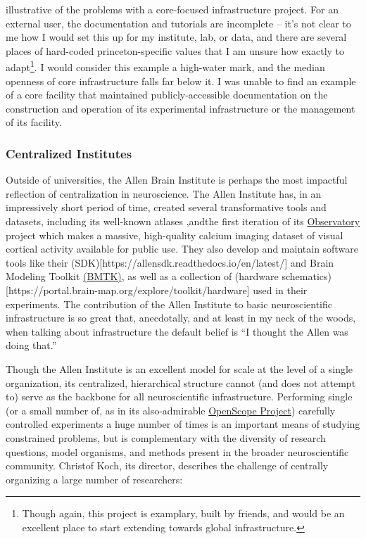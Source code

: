 \documentclass{article}
\begin{document}
illustrative of the problems with a core-focused infrastructure project.
For an external user, the documentation and tutorials are incomplete --
it's not clear to me how I would set this up for my institute, lab, or
data, and there are several places of hard-coded princeton-specific
values that I am unsure how exactly to adapt\footnote{Though again, this
  project is examplary, built by friends, and would be an excellent
  place to start extending towards global infrastructure.}. I would
consider this example a high-water mark, and the median openness of core
infrastructure falls far below it. I was unable to find an example of a
core facility that maintained publicly-accessible documentation on the
construction and operation of its experimental infrastructure or the
management of its facility.

\hypertarget{centralized-institutes}{%
\subsubsection{Centralized Institutes}\label{centralized-institutes}}

Outside of universities, the Allen Brain Institute is perhaps the most
impactful reflection of centralization in neuroscience. The Allen
Institute has, in an impressively short period of time, created several
transformative tools and datasets, including its well-known atlases \cite{leinGenomewideAtlasGene2007},andthe first iteration of its
\href{http://observatory.brain-map.org/}{Observatory} project which
makes a massive, high-quality calcium imaging dataset of visual cortical
activity available for public use. They also develop and maintain
software tools like their
(SDK){[}https://allensdk.readthedocs.io/en/latest/{]} and Brain Modeling
Toolkit \href{https://alleninstitute.github.io/bmtk/}{(BMTK)}, as well
as a collection of (hardware
schematics){[}https://portal.brain-map.org/explore/toolkit/hardware{]}
used in their experiments. The contribution of the Allen Institute to
basic neuroscientific infrastructure is so great that, anecdotally, and
at least in my neck of the woods, when talking about infrastructure the
default belief is ``I thought the Allen was doing that.''

Though the Allen Institute is an excellent model for scale at the level
of a single organization, its centralized, hierarchical structure cannot
(and does not attempt to) serve as the backbone for all neuroscientific
infrastructure. Performing single (or a small number of, as in its
also-admirable
\href{https://alleninstitute.org/what-we-do/brain-science/news-press/articles/three-collaborative-studies-launch-openscope-shared-observatory-neuroscience}{OpenScope
Project}) carefully controlled experiments a huge number of times is an
important means of studying constrained problems, but is complementary
with the diversity of research questions, model organisms, and methods
present in the broader neuroscientific community. Christof Koch, its
director, describes the challenge of centrally organizing a large number
of researchers:
\end{document}
